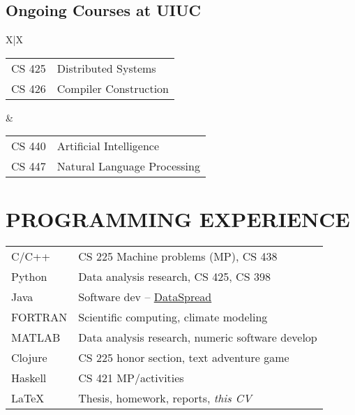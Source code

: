 \documentclass{res}
\let\oldsection\section
\let\oldsubsection\subsection
\renewcommand{\section}[1]{\vspace{-0.1in}\oldsection{#1}}
\renewcommand{\subsection}[1]{\vspace{-0.2in}\oldsubsection{#1}\vspace{-0.25in}}
\begin{document}
\begin{resume}
	\subsection{Ongoing Courses at UIUC}
	\begin{tabularx}{\textwidth}{X|X}
		\begin{tabular}{rl}
			CS 425 & Distributed Systems   \\
			CS 426 & Compiler Construction \\
		\end{tabular}
		 & 
		\begin{tabular}{rl}
			CS 440 & Artificial Intelligence     \\
			CS 447 & Natural Language Processing \\
		\end{tabular}
	\end{tabularx}%
	
	\section{PROGRAMMING EXPERIENCE}
	\vspace{2pt}
	\begin{tabular}{p{4cm}l}
		C/C++   & CS 225 Machine problems (MP), CS 438                  \\
		Python  & Data analysis research, CS 425, CS 398                \\
		Java    & Software dev -- 
		\href{https://github.com/dataspread/dataspread-web}{DataSpread} \\
		FORTRAN & Scientific computing, climate modeling                \\
		MATLAB  & Data analysis research, numeric software develop      \\
		Clojure & CS 225 honor section, text adventure game             \\
		Haskell & CS 421 MP/activities                                  \\
		\LaTeX  & Thesis, homework, reports, \emph{this CV}
	\end{tabular}
	

\end{resume}
\end{document}
